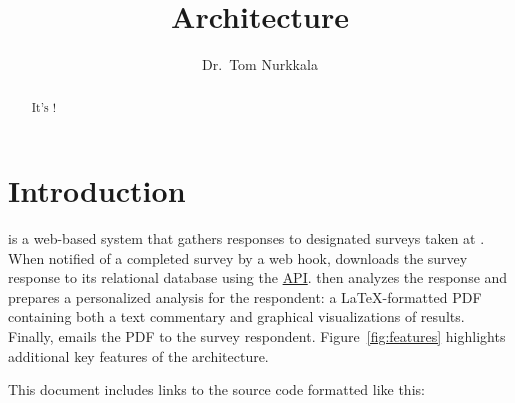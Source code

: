 \documentclass{article}
\title{\caper{} Architecture}
\author{Dr.\ Tom Nurkkala}
\begin{document}
\maketitle

\begin{abstract}
  It's \caper!
\end{abstract}

\tableofcontents

\section{Introduction}
\label{sec:introduction}

\caper{} is a web-based system
that gathers responses to designated surveys taken at {\qual}.
When notified of a completed survey by a \qual{} web hook,
\caper{}
downloads the survey response
to its \pg{} relational database
using the
\qual{} \href{https://api.qualtrics.com/}{\rest{} API}.
\caper{} then
analyzes the response and
prepares a personalized analysis for the respondent:
a \LaTeX-formatted PDF containing both a text commentary
and graphical visualizations of results.
Finally, \caper{}
emails the PDF to the survey respondent.
Figure~\ref{fig:features} highlights additional
key features of the \caper{} architecture.

This document includes
links to the \caper{} source code
formatted like this:
\end{document}
